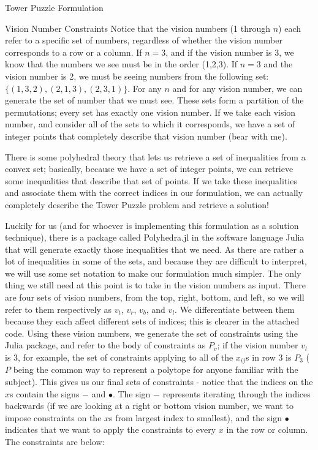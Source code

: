 \documentclass[12pt]{article}
\begin{document}
\begin{section}{Tower Puzzle Formulation}
\begin{subsection}{Vision Number Constraints}
Notice that the vision numbers (1 through $n$) each refer to a specific set of numbers, regardless of whether the vision number corresponds to a row or a column. If $n=3$, and if the vision number is 3, we know that the numbers we see must be in the order (1,2,3). If $n=3$ and the vision number is 2, we must be seeing numbers from the following set: $\{(1,3,2), (2,1,3), (2,3,1)\}$. For any $n$ and for any vision number, we can generate the set of number that we must see. These sets form a partition of the permutations; every set has exactly one vision number. If we take each vision number, and consider all of the sets to which it corresponds, we have a set of integer points that completely describe that vision number (bear with me).

There is some polyhedral theory that lets us retrieve a set of inequalities from a convex set; basically, because we have a set of integer points, we can retrieve some inequalities that describe that set of points. If we take these inequalities and associate them with the correct indices in our formulation, we can actually completely describe the Tower Puzzle problem and retrieve a solution!

Luckily for us (and for whoever is implementing this formulation as a solution technique), there is a package called Polyhedra.jl in the software language Julia that will generate exactly those inequalities that we need. As there are rather a lot of inequalities in some of the sets, and because they are difficult to interpret, we will use some set notation to make our formulation much simpler. The only thing we still need at this point is to take in the vision numbers as input. There are four sets of vision numbers, from the top, right, bottom, and left, so we will refer to them respectively as $v_t$, $v_r$, $v_b$, and $v_l$. We differentiate between them because they each affect different sets of indices; this is clearer in the attached code. Using these vision numbers, we generate the set of constraints using the Julia package, and refer to the body of constraints as $P_v$; if the vision number $v_l$ is 3, for example, the set of constraints applying to all of the $x_{ij}$s in row 3 is $P_3$ ($P$ being the common way to represent a polytope for anyone familiar with the subject). This gives us our final sets of constraints - notice that the indices on the $x$s contain the signs $-$ and $\bullet$. The sign $-$ represents iterating through the indices backwards (if we are looking at a right or bottom vision number, we want to impose constraints on the $x$s from largest index to smallest), and the sign $\bullet$ indicates that we want to apply the constraints to every $x$ in the row or column. The constraints are below:


\end{subsection}
\end{section}
\end{document}
